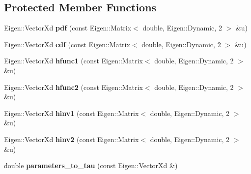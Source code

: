 \subsection*{Protected Member Functions}
\begin{DoxyCompactItemize}
\item 
\hypertarget{classvinecopulib_1_1_kernel_bicop_a307624ad91ab1fd38ae7933fab0a5f6a}{Eigen\+::\+Vector\+Xd {\bfseries pdf} (const Eigen\+::\+Matrix$<$ double, Eigen\+::\+Dynamic, 2 $>$ \&u)}\label{classvinecopulib_1_1_kernel_bicop_a307624ad91ab1fd38ae7933fab0a5f6a}

\item 
\hypertarget{classvinecopulib_1_1_kernel_bicop_ab0a7dde42314757b002e165ad96d1107}{Eigen\+::\+Vector\+Xd {\bfseries cdf} (const Eigen\+::\+Matrix$<$ double, Eigen\+::\+Dynamic, 2 $>$ \&u)}\label{classvinecopulib_1_1_kernel_bicop_ab0a7dde42314757b002e165ad96d1107}

\item 
\hypertarget{classvinecopulib_1_1_kernel_bicop_a08a6961d233bc977e583b5253c6089dc}{Eigen\+::\+Vector\+Xd {\bfseries hfunc1} (const Eigen\+::\+Matrix$<$ double, Eigen\+::\+Dynamic, 2 $>$ \&u)}\label{classvinecopulib_1_1_kernel_bicop_a08a6961d233bc977e583b5253c6089dc}

\item 
\hypertarget{classvinecopulib_1_1_kernel_bicop_ae4983795f404cca9c4a6af15d41b104a}{Eigen\+::\+Vector\+Xd {\bfseries hfunc2} (const Eigen\+::\+Matrix$<$ double, Eigen\+::\+Dynamic, 2 $>$ \&u)}\label{classvinecopulib_1_1_kernel_bicop_ae4983795f404cca9c4a6af15d41b104a}

\item 
\hypertarget{classvinecopulib_1_1_kernel_bicop_aca726ccdf9a1551fb342dd7e60de1f84}{Eigen\+::\+Vector\+Xd {\bfseries hinv1} (const Eigen\+::\+Matrix$<$ double, Eigen\+::\+Dynamic, 2 $>$ \&u)}\label{classvinecopulib_1_1_kernel_bicop_aca726ccdf9a1551fb342dd7e60de1f84}

\item 
\hypertarget{classvinecopulib_1_1_kernel_bicop_a809dc2c7f0a67d217e0fe9651a625a6b}{Eigen\+::\+Vector\+Xd {\bfseries hinv2} (const Eigen\+::\+Matrix$<$ double, Eigen\+::\+Dynamic, 2 $>$ \&u)}\label{classvinecopulib_1_1_kernel_bicop_a809dc2c7f0a67d217e0fe9651a625a6b}

\item 
\hypertarget{classvinecopulib_1_1_kernel_bicop_a1c00a74e12159b2c06487cf1b3ccff00}{double {\bfseries parameters\+\_\+to\+\_\+tau} (const Eigen\+::\+Vector\+Xd \&)}\label{classvinecopulib_1_1_kernel_bicop_a1c00a74e12159b2c06487cf1b3ccff00}


\end{DoxyCompactItemize}
